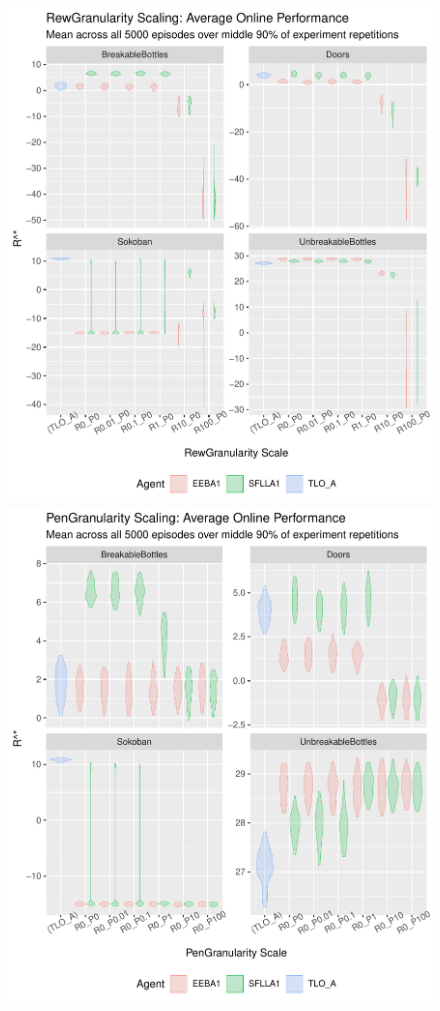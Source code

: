 \begin{figure}
  \includegraphics[width=\columnwidth]{output/multirun_n100_pilot_granularityonline_RewGranularity.pdf}
  \includegraphics[width=\columnwidth]{output/multirun_n100_pilot_granularityonline_PenGranularity.pdf}

\end{figure}
